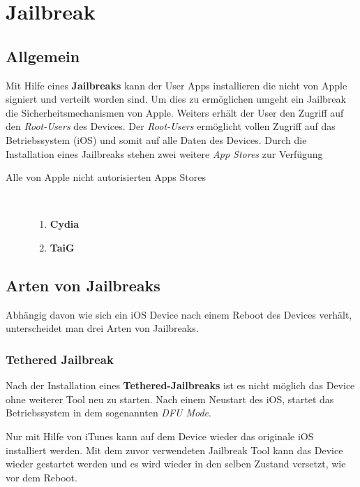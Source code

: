 %
%
% 
%
% 


\chapter{Jailbreak}
\label{ch:JB}

\section{Allgemein}
\label{sec:JBAllgemein}

Mit Hilfe eines \textbf{Jailbreaks} kann der User Apps installieren die nicht von Apple signiert und verteilt worden sind. Um dies zu ermöglichen umgeht ein Jailbreak die Sicherheitsmechanismen von Apple. Weiters erhält der User den Zugriff auf den \textit{\glqq Root-Users\grqq{}} des Devices. Der \textit{\glqq Root-Users\grqq{}} ermöglicht vollen Zugriff auf das Betriebssystem (iOS) und somit auf alle Daten des Devices. Durch die Installation eines Jailbreaks stehen zwei weitere \textit{\glqq App Stores\grqq{}} zur Verfügung

\begin{description}
\item[Alle von Apple nicht autorisierten Apps Stores]~
	\begin{enumerate}
	   	\item \textbf{Cydia} \cite{Cydia[1]}
		\item \textbf{TaiG}
	\end{enumerate}
\end{description}

\section{Arten von Jailbreaks}
\label{sec:JBArten}
Abhängig davon wie sich ein iOS Device nach einem Reboot des Devices verhält, unterscheidet man drei Arten von Jailbreaks. 

\subsection{Tethered Jailbreak}
\label{sec:JBTethered}
Nach der Installation eines \textbf{Tethered-Jailbreaks} ist es nicht möglich das Device ohne weiterer Tool neu zu starten. Nach einem Neustart des iOS, startet das Betriebssystem in dem sogenannten \textit{\glqq DFU Mode\grqq{}}. \par
Nur mit Hilfe von iTunes kann auf dem Device wieder das originale iOS installiert werden. Mit dem zuvor verwendeten Jailbreak Tool kann das Device wieder gestartet werden und es wird wieder in den selben Zustand versetzt, wie vor dem Reboot.  

